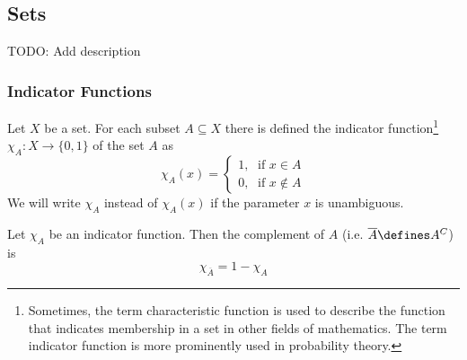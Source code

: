 \subsection{Sets}\label{subsec-sets}


TODO: Add description

\subsubsection{Indicator Functions}\label{subsubsec-indicator-functions}

\begin{definition}\label{def-indicator-function}
    Let $X$ be a set. For each subset $A \subseteq X$ there is defined the 
    indicator function\footnote{Sometimes, the term characteristic function is 
    used to describe the function that indicates membership in a set in other 
    fields of mathematics. The term indicator function is more prominently used 
    in probability theory.} $\chi_A:X\rightarrow \{0,1\}$ of the set $A$ as
    \begin{equation}
        \chi_A(x) = \begin{cases}
            1,\;\text{ if } x \in A \\
            0,\;\text{ if } x \notin A
        \end{cases}
    \end{equation}
    We will write $\chi_A$ instead of $\chi_A(x)$ if the parameter
    $x$ is unambiguous.
\end{definition}

\begin{thm}\label{thm-complement-indicator-function}
    Let $\chi_A$ be an indicator function. Then the complement of $A$ (i.e. 
    $\overline{A} \defines A^C$) is
    \begin{equation*}
        \chi_{\overline{A}} = 1 - \chi_A
    \end{equation*}
\end{thm}

